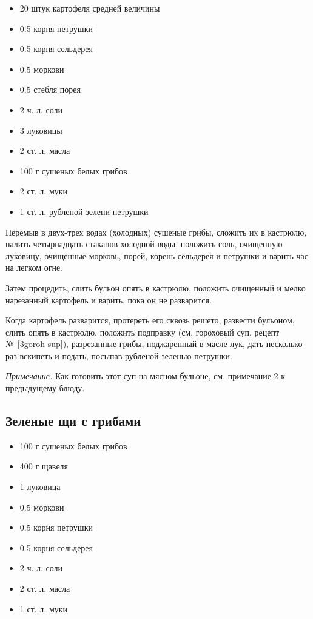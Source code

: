 \begin{itemize}
	\item 20 штук картофеля средней величины
    \item 0.5 корня петрушки
    \item 0.5 корня сельдерея
    \item 0.5 моркови
    \item 0.5 стебля порея
    \item 2 ч. л. соли
    \item 3 луковицы
    \item 2 ст. л. масла
    \item 100 г сушеных белых грибов
    \item 2 ст. л. муки
    \item 1 ст. л. рубленой зелени петрушки
\end{itemize}

Перемыв в двух-трех водах (холодных) сушеные грибы, сложить их в кастрюлю, налить четырнадцать стаканов холодной воды, положить соль, очищенную луковицу, очищенные морковь, порей, корень сельдерея и петрушки и варить час на легком огне.

Затем процедить, слить бульон опять в кастрюлю, положить очищенный и мелко нарезанный картофель и варить, пока он не разварится.

Когда картофель разварится, протереть его сквозь решето, развести бульоном, слить опять в кастрюлю, положить подправку (см. гороховый суп, рецепт №~\ref{3goroh-sup}), разрезанные грибы, поджаренный в масле лук, дать несколько раз вскипеть и подать, посыпав рубленой зеленью петрушки.

\emph{Примечание.} Как готовить этот суп на мясном бульоне, см. примечание 2 к предыдущему блюду.

\subsection{Зеленые щи с грибами}\label{7zel-schi-grib}

\begin{itemize}
	\item 100 г сушеных белых грибов
    \item 400 г щавеля
    \item 1 луковица
    \item 0.5 моркови 
    \item 0.5 корня петрушки
    \item 0.5 корня сельдерея 
    \item 2 ч. л. соли 
    \item 2 ст. л. масла 
    \item 1 ст. л. муки
\end{itemize}


